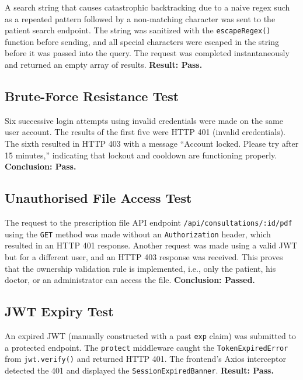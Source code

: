 A search string that causes catastrophic backtracking due to
a naive regex such as a repeated pattern followed by a non-matching
character was sent to the patient search endpoint. The string was
sanitized with the \texttt{escapeRegex()} function before sending,
and all special characters were escaped in the string before it was
passed into the query. The request was completed instantaneously and
returned an empty array of results. \textbf{Result: Pass.}

\subsection{Brute-Force Resistance Test}

Six successive login attempts using invalid credentials were made on the same user account. The results of the first five were HTTP 401 (invalid credentials). The sixth resulted in HTTP 403 with a message ``Account locked. Please try after 15 minutes,'' indicating that lockout and cooldown are functioning properly. \textbf{Conclusion: Pass.}

\subsection{Unauthorised File Access Test}

\begin{sloppypar}
The request to the prescription file API endpoint \texttt{/api/consultations/:id/pdf} using the \texttt{GET} method was made without an \texttt{Authorization} header, which resulted in an HTTP 401 response. Another request was made using a valid JWT but for a different user, and an HTTP 403 response was received. This proves that the ownership validation rule is implemented, i.e., only the patient, his doctor, or an administrator can access the file. \textbf{Conclusion: Passed.}
\end{sloppypar}

\subsection{JWT Expiry Test}

\begin{sloppypar}
An expired JWT (manually constructed with a past \texttt{exp} claim)
was submitted to a protected endpoint. The \texttt{protect} middleware
caught the \texttt{TokenExpiredError} from \texttt{jwt.verify()} and
returned HTTP 401. The frontend's Axios interceptor detected the 401
and displayed the \texttt{SessionExpiredBanner}. \textbf{Result: Pass.}
\end{sloppypar}

